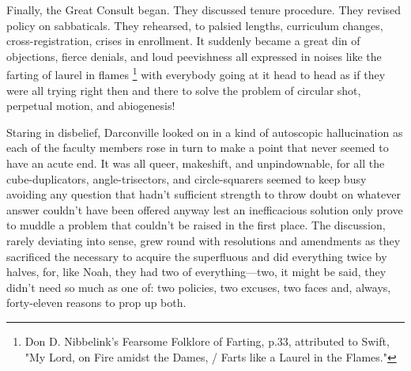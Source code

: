   Finally, the Great Consult began. They discussed tenure procedure. They
revised policy on sabbaticals. They rehearsed, to palsied 
lengths, curriculum changes, cross-registration, crises in enrollment. It 
suddenly became a great din 
of objections, fierce denials, and loud peevishness 
all expressed in noises like the farting of laurel in flames 
\footnote{Don D. Nibbelink's Fearsome Folklore of Farting, p.33, attributed to 
  Swift, "My Lord, on Fire amidst the Dames, / Farts like a Laurel in the
  Flames."}
with everybody going 
at it head to head as if they were all trying right then and there to solve the 
problem of circular shot, perpetual motion, and abiogenesis!

  Staring in disbelief, Darconville looked on in a kind of autoscopic
hallucination 
as each of the faculty members rose in turn to make a point that
never seemed to have an acute end. It was all queer, makeshift, 
and unpindownable, for all the cube-duplicators, angle-trisectors, and
circle-squarers seemed to keep busy avoiding any question that hadn't sufficient
strength to throw doubt on whatever answer couldn't have been offered anyway lest 
an inefficacious solution only prove to muddle a problem that couldn't be
raised in the first place. The discussion, rarely deviating into sense, grew
round with resolutions and amendments as they sacrificed the necessary to
acquire the superfluous 
and did everything twice by halves, for, like Noah, they
had two of everything---two, it might be said, they didn't need so much as one of:
two policies, two excuses, two faces and, always, forty-eleven reasons to prop
up both.

